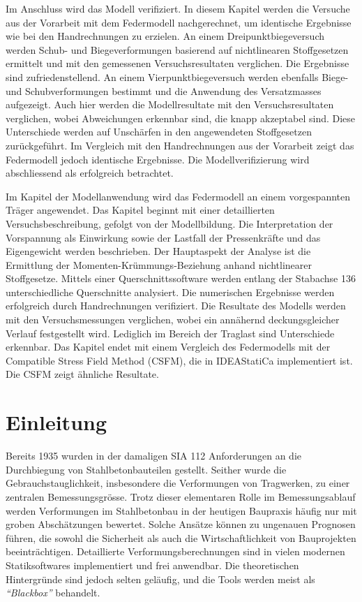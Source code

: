 \documentclass[
  11pt,
  letterpaper,
]{scrreprt}
\renewcommand*\contentsname{Inhaltsverzeichnis}
\newcommand\contentsname{Inhaltsverzeichnis}
\begin{document}
Im Anschluss wird das Modell verifiziert. In diesem Kapitel werden die Versuche aus der Vorarbeit mit dem Federmodell nachgerechnet, um identische Ergebnisse wie bei den Handrechnungen zu erzielen. An einem Dreipunktbiegeversuch werden Schub- und Biegeverformungen basierend auf nichtlinearen Stoffgesetzen ermittelt und mit den gemessenen Versuchsresultaten verglichen. Die Ergebnisse sind zufriedenstellend. An einem Vierpunktbiegeversuch werden ebenfalls Biege- und Schubverformungen bestimmt und die Anwendung des Versatzmasses aufgezeigt. Auch hier werden die Modellresultate mit den Versuchsresultaten verglichen, wobei Abweichungen erkennbar sind, die knapp akzeptabel sind. Diese Unterschiede werden auf Unschärfen in den angewendeten Stoffgesetzen zurückgeführt. Im Vergleich mit den Handrechnungen aus der Vorarbeit zeigt das Federmodell jedoch identische Ergebnisse. Die Modellverifizierung wird abschliessend als erfolgreich betrachtet.

Im Kapitel der Modellanwendung wird das Federmodell an einem vorgespannten Träger angewendet. Das Kapitel beginnt mit einer detaillierten Versuchsbeschreibung, gefolgt von der Modellbildung. Die Interpretation der Vorspannung als Einwirkung sowie der Lastfall der Pressenkräfte und das Eigengewicht werden beschrieben. Der Hauptaspekt der Analyse ist die Ermittlung der Momenten-Krümmungs-Beziehung anhand nichtlinearer Stoffgesetze. Mittels einer Querschnittssoftware werden entlang der Stabachse 136 unterschiedliche Querschnitte analysiert. Die numerischen Ergebnisse werden erfolgreich durch Handrechnungen verifiziert. Die Resultate des Modells werden mit den Versuchsmessungen verglichen, wobei ein annähernd deckungsgleicher Verlauf festgestellt wird. Lediglich im Bereich der Traglast sind Unterschiede erkennbar. Das Kapitel endet mit einem Vergleich des Federmodells mit der Compatible Stress Field Method (CSFM), die in IDEAStatiCa implementiert ist. Die CSFM zeigt ähnliche Resultate.

\renewcommand*\contentsname{Inhaltsverzeichnis}
{
\hypersetup{linkcolor=}
\setcounter{tocdepth}{1}
\tableofcontents
}
\listoffigures
{}

\chapter{Einleitung}\label{einleitung}

Bereits 1935 wurden in der damaligen SIA 112 Anforderungen an die
Durchbiegung von Stahlbetonbauteilen gestellt. Seither wurde die
Gebrauchstauglichkeit, insbesondere die Verformungen von Tragwerken, zu
einer zentralen Bemessungsgrösse. Trotz dieser elementaren Rolle im
Bemessungsablauf werden Verformungen im Stahlbetonbau in der heutigen
Baupraxis häufig nur mit groben Abschätzungen bewertet. Solche Ansätze
können zu ungenauen Prognosen führen, die sowohl die Sicherheit als auch
die Wirtschaftlichkeit von Bauprojekten beeinträchtigen. Detaillierte
Verformungsberechnungen sind in vielen modernen Statiksoftwares
implementiert und frei anwendbar. Die theoretischen Hintergründe sind
jedoch selten geläufig, und die Tools werden meist als
\emph{``Blackbox''} behandelt.
\end{document}
